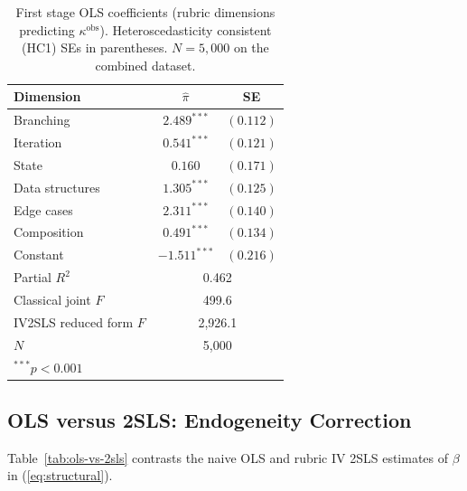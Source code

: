 \documentclass[conference]{IEEEtran}
\begin{document}
\begin{table}[h]
\centering
\caption{First stage OLS coefficients (rubric dimensions predicting $\kappa^{\text{obs}}$). Heteroscedasticity consistent (HC1) SEs in parentheses. $N=5{,}000$ on the combined dataset.}
\label{tab:stage1}
\begin{tabular}{@{}lcc@{}}
\toprule
Dimension & $\hat{\pi}$ & SE \\
\midrule
Branching        & $2.489^{***}$  & $(0.112)$ \\
Iteration        & $0.541^{***}$  & $(0.121)$ \\
State            & $0.160$        & $(0.171)$ \\
Data structures  & $1.305^{***}$  & $(0.125)$ \\
Edge cases       & $2.311^{***}$  & $(0.140)$ \\
Composition      & $0.491^{***}$  & $(0.134)$ \\
Constant         & $-1.511^{***}$ & $(0.216)$ \\
\midrule
Partial $R^2$                & \multicolumn{2}{c}{0.462} \\
Classical joint $F$          & \multicolumn{2}{c}{499.6} \\
IV2SLS reduced form $F$      & \multicolumn{2}{c}{2{,}926.1} \\
$N$                          & \multicolumn{2}{c}{5{,}000} \\
\bottomrule
\multicolumn{3}{l}{\footnotesize $^{***}p<0.001$}
\end{tabular}
\end{table}

\subsection{OLS versus 2SLS: Endogeneity Correction}

Table~\ref{tab:ols-vs-2sls} contrasts the naive OLS and rubric IV 2SLS estimates of $\beta$ in (\ref{eq:structural}).
\end{document}
